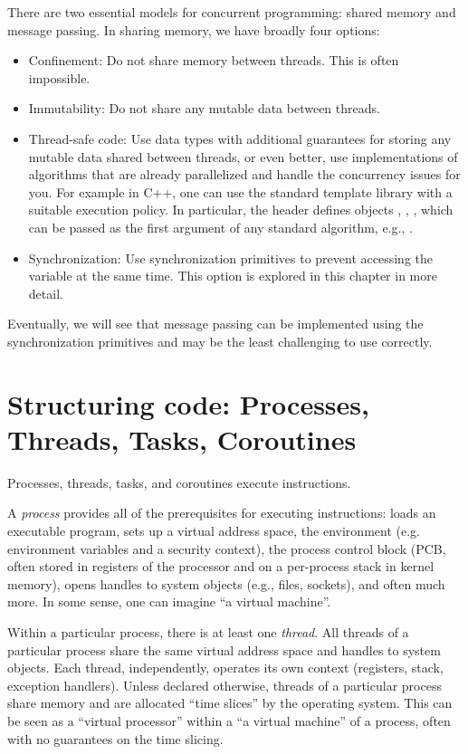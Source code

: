 There are two essential models for concurrent programming: shared memory and message passing. In sharing memory, we have broadly four options:
\begin{itemize}
\item Confinement: Do not share memory between threads. This is often impossible.
\item Immutability: Do not share any mutable data between threads. 
\item Thread-safe code: Use data types with additional guarantees for storing any mutable data shared between threads, or even better, use implementations of algorithms that are already parallelized and handle the concurrency issues for you. For example in C++, one can use the standard template library with a suitable execution policy. In particular, the header  defines objects , , , which can be passed as the first argument of any standard algorithm, e.g., . 
\item Synchronization: Use synchronization primitives to prevent accessing the variable at the same time. This option is explored in this chapter in more detail. 
\end{itemize}
Eventually, we will see that message passing can be implemented using the synchronization primitives and may be the least challenging to use correctly. 

\section{Structuring code: Processes, Threads, Tasks, Coroutines}

Processes, threads, tasks, and coroutines execute instructions. 

A \emph{process} provides all of the prerequisites for executing instructions: loads an executable program, sets up a virtual address space, the environment (e.g. environment variables and a security context), the process control block (PCB, often stored in registers of the processor and on a per-process stack in kernel memory), opens handles to system objects (e.g., files, sockets), and often much more. In some sense, one can imagine ``a virtual machine''.

Within a particular process, there is at least one \emph{thread}. All threads of a particular process share the same virtual address space and handles to system objects. Each thread, independently, operates its own context (registers, stack, exception handlers). Unless declared otherwise, threads of a particular process share memory and are allocated ``time slices'' by the operating system. This can be seen as a ``virtual processor'' within a ``a virtual machine'' of a process, often with no guarantees on the time slicing.

